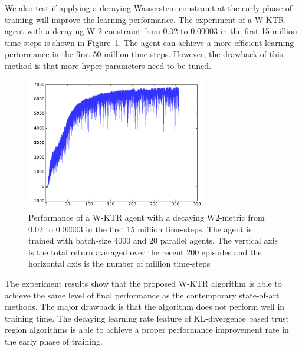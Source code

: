 We also test if applying a decaying Wasserstein constraint at the early phase of training will improve the learning performance. The experiment of a W-KTR agent with a decaying W-2 constraint from 0.02 to 0.00003 in the first 15 million time-steps is shown in Figure~\ref{fig_wass_decay}. The agent can achieve a more efficient learning performance in the first 50 million time-steps. However, the drawback of this method is that more hyper-parameters need to be tuned.
\begin{figure}[!htbp]
	\includegraphics[width=0.7\textwidth]{images/rec_wass_decay}
	\centering
	\caption{Performance of a W-KTR agent with a decaying W2-metric from 0.02 to 0.00003 in the first 15 million time-steps. The agent is trained with batch-size 4000 and 20 parallel agents. The vertical axis is the total return averaged over the recent 200 episodes and the horizontal axis is the number of million time-steps}\label{fig_wass_decay}
\end{figure}

The experiment results show that the proposed W-KTR algorithm is able to achieve the same level of final performance as the contemporary state-of-art methods. The major drawback is that the algorithm does not perform well in training time. The decaying learning rate feature of KL-divergence based trust region algorithms is able to achieve a proper performance improvement rate in the early phase of training.
